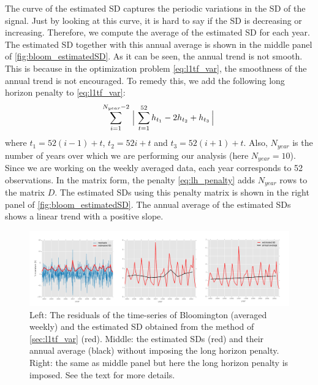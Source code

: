 \documentclass{article}
\begin{document}
The curve of the estimated SD captures the periodic variations in the
SD of the signal. Just by looking at this curve, it is hard to say if
the SD is decreasing or increasing. Therefore, we compute the average
of the estimated SD for each year. The estimated SD together with this
annual average is shown in the middle panel of
\autoref{fig:bloom_estimatedSD}. As it can be seen, the annual trend
is not smooth. This is because in the optimization problem
\eqref{eq:l1tf_var}, the smoothness of the annual trend is not
encouraged. To remedy this, we add the following long horizon penalty
to \eqref{eq:l1tf_var}: 
\begin{equation}
\sum_{i=1}^{N_{year}-2} \Big\arrowvert \sum_{t=1}^{52} h_{t_1}-2h_{t_2}+h_{t_3}  \Big\arrowvert
\label{eq:lh_penalty}
\end{equation}
 where $t_1=52(i-1)+t$, $t_2=52i+t$ and $t_3=52(i+1)+t$. Also,
 $N_{year}$ is the number of years over which we are performing our
 analysis (here $N_{year}=10$). Since we are working on the weekly
 averaged data, each year corresponds to 52 observations. In the
 matrix form, the penalty \eqref{eq:lh_penalty} adds $N_{year}$ rows
 to the matrix $D$. The estimated SDs using this penalty matrix is
 shown in the right panel of \autoref{fig:bloom_estimatedSD}. The
 annual average of the estimated SDs shows a linear trend with a
 positive slope. 

\begin{figure}[tb]
  \centering
  \includegraphics[width=\columnwidth]{Figures/bloom_estimatedSD}
  \caption{Left: The residuals of the time-series of Bloomington
    (averaged weekly) and the estimated SD obtained from the method of
    \autoref{sec:l1tf_var} (red). Middle: the estimated SDs (red) and
    their annual average (black) without imposing the long horizon
    penalty. Right: the same as middle panel but here the long horizon
    penalty is imposed. See the text for more details.} 
  \label{fig:bloom_estimatedSD}
\end{figure} 

\end{document}

